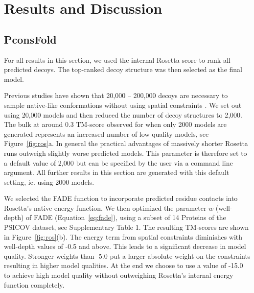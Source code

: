 \documentclass{bioinfo}
\begin{document}
\section{Results and Discussion}

\subsection{PconsFold}


For all results in this section, we used the internal Rosetta score to
rank all predicted decoys. The top-ranked decoy structure was then
selected as the  final model.

Previous studies have shown that 20,000 -- 200,000 decoys are
necessary to sample native-like conformations without using spatial
constraints \cite[]{Simons10526365}. We set out using 20,000 models
and then reduced the number of decoy structures to
2,000. The bulk at around 0.3 TM-score observed for when only 2000
models are generated represents an increased
number of low quality models, see Figure~\ref{fig:ros}a. In general the practical advantages of
massively shorter Rosetta runs outweigh slightly worse predicted
models. This parameter is therefore set to a default value of 2,000
but can be specified by the user via a command line argument. All
further results in this section are generated with this default
setting, ie. using 2000 models. 


We selected the FADE function to incorporate predicted residue
contacts into Rosetta's native energy function. We then optimized the
parameter $w$ (well-depth) of FADE (Equation~\ref{eq:fade}), using a
subset of 14 Proteins of the PSICOV
dataset, see Supplementary Table 1. The resulting TM-scores are shown in Figure~\ref{fig:ros}(b). The energy term from spatial constraints diminishes with
well-depth values of -0.5 and above. This leads to a significant
decrease in model quality. Stronger weights than -5.0  put a larger
absolute weight on the constraints resulting in higher model
qualities. At the end we choose to use a value of -15.0 to achieve
high model quality without outweighing Rosetta's internal energy
function completely.
\end{document}
